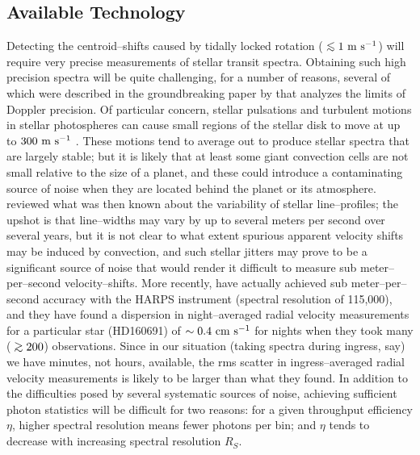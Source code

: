 \documentclass[12pt,preprint]{aastex}
\def\gsim{\;\rlap{\lower 2.5pt
 \hbox{$\sim$}}\raise 1.5pt\hbox{$>$}\;}
\def\lsim{\;\rlap{\lower 2.5pt
   \hbox{$\sim$}}\raise 1.5pt\hbox{$<$}\;}
\begin{document}
\subsection{Available Technology}
\label{ssec:tech}
Detecting the centroid--shifts caused by tidally locked rotation
($\lsim 1 {\rm ~m~s^{-1}}$) will require very precise measurements of
stellar transit spectra.  Obtaining such high precision spectra will be
quite challenging, for a number of reasons, several of which were
described in the groundbreaking paper by \citet{butler_et_al1996}
that analyzes the limits of Doppler precision.  Of particular concern,
stellar pulsations and turbulent motions in stellar photospheres can cause
small regions of the stellar disk to move at up to $300 {\rm ~m~s^{-1}}$
\citep{dravins1985, ulrich1991}.  These motions tend to average out to produce
stellar spectra that are largely stable; but it is likely that at least some
giant convection cells are not small relative to the size of a planet, and
these could introduce a contaminating source of noise when they are located
behind the planet or its atmosphere.
\citet{butler_et_al1996} reviewed what was then known about the
variability of stellar line--profiles; the upshot is that line--widths may
vary by up to several meters per second over several years, but it is not
clear to what extent spurious apparent velocity shifts may be induced by
convection, and such stellar jitters may prove to be a significant source of
noise that would render it difficult to measure sub meter--per--second
velocity--shifts.  More recently, \citet{bouchy_et_al2005b} have actually
achieved sub meter--per--second accuracy with the HARPS instrument (spectral
resolution of 115,000), and they have found a dispersion in night--averaged
radial velocity measurements for a particular star (HD160691) of
$\sim 0.4 {\rm ~cm~s^{-1}}$ for nights when they took many ($\gsim 200$)
observations.  Since in our situation (taking spectra during ingress, say) we
have minutes, not hours, available, the rms scatter in ingress--averaged radial
velocity measurements is likely to be larger than what they found.  In addition
to the difficulties posed by several systematic sources of noise, achieving
sufficient photon statistics will be difficult for two reasons: for a given
throughput efficiency $\eta$, higher spectral resolution means fewer photons
per bin; and $\eta$ tends to decrease with increasing spectral resolution
$R_S$.
\end{document}
